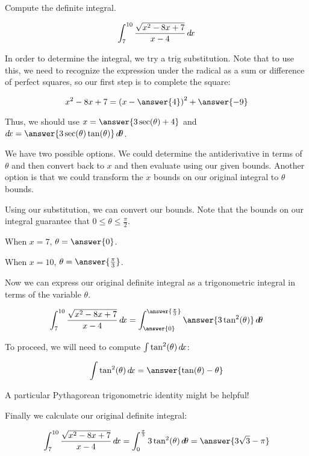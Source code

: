 \documentclass{ximera}
\author{Jim Talamo and Jason Miller}
\begin{document}
\begin{exercise}
Compute the definite integral. 

\[
\int_{7}^{10} \frac{\sqrt{x^{2}-8x+7}}{x-4} \mathop{}\!d\! x
\]



In order to determine the integral, we try a trig substitution.  Note that to use this, we need to recognize the expression under the radical as a sum or difference of perfect squares, so our first step is to complete the square:

\[
x^2-8x+7 = \left(x - \answer{4}\right)^2+\answer{-9}
\]

\begin{exercise}
Thus, we should use $x=\answer{3\sec(\theta)+4}$ and $\d x= \answer{ 3\sec(\theta)\tan(\theta)} \d \theta$. 


\begin{exercise}
We have two possible options. We could determine the antiderivative in terms of $\theta$ 
and then convert back to $x$ and then evaluate using our given bounds. 
Another option is that we could transform the $x$ bounds on our original integral to $\theta$ bounds. 

Using our substitution, we can convert our bounds. Note that the bounds on our integral guarantee that $0\leq \theta \leq \frac{\pi}{2}$. 

When $x=7$, $\theta=\answer{0}$. 

When $x=10$, $\theta=\answer{\frac{\pi}{3}}$. 



\begin{exercise}


Now we can express our original definite integral as a trigonometric integral in terms of the variable $\theta$. 

\[
\int_{7}^{10} \frac{\sqrt{x^{2}-8x+7}}{x-4}  \d x= \int_{\answer{0}}^{\answer{\frac{\pi}{3}}}  \answer{3\tan^{2}(\theta)}   \d \theta
\]

\begin{exercise}
To proceed, we will need to compute $\int \tan^2(\theta) \mathop{}\!d\! x$:

\[
\int \tan^2(\theta) \d x = \answer{\tan(\theta)-\theta}
\]

\begin{hint}
A particular Pythagorean trigonometric identity might be helpful!
\end{hint}

\begin{exercise}
Finally we calculate our original definite integral: 

\[
\int_{7}^{10} \frac{\sqrt{x^{2}-8x+7}}{x-4} \d x=\int_{0}^{\frac{\pi}{3}} 3\tan^{2}(\theta) \d \theta=\answer{3\sqrt{3}-\pi}
\]


\end{exercise}
\end{exercise}
\end{exercise}
\end{exercise}
\end{exercise}

\end{exercise}
\end{document}
